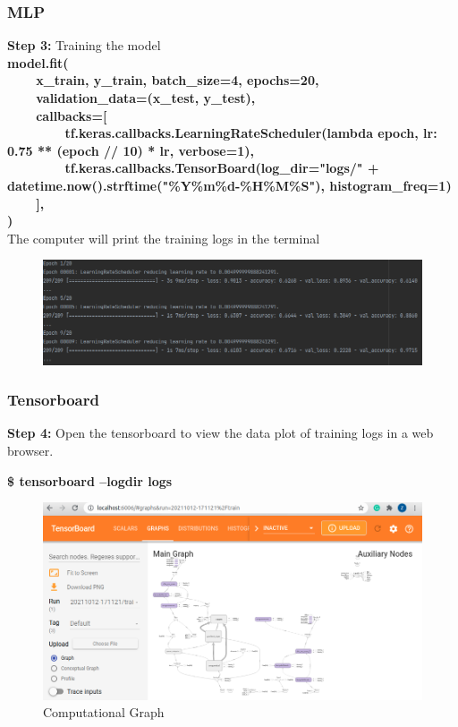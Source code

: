 \documentclass{beamer}
\begin{document}
\begin{frame}
	\frametitle{MLP}
	\begin{flushleft}
		\textbf{Step 3:} Training the model \\
		\textbf{\color{blue} \scriptsize
			model.fit( \\
			~~~~x\_train, y\_train, batch\_size=4, epochs=20, \\
			~~~~validation\_data=(x\_test,  y\_test), \\
			~~~~callbacks=[ \\
			~~~~~~~~tf.keras.callbacks.LearningRateScheduler(lambda epoch, lr: 0.75 ** (epoch // 10) * lr, verbose=1), \\
			~~~~~~~~tf.keras.callbacks.TensorBoard(log\_dir="logs/" + datetime.now().strftime("\%Y\%m\%d-\%H\%M\%S"), histogram\_freq=1) \\
			~~~~], \\
			) \\
		}
		The computer will print the training logs in the terminal
	\end{flushleft}
	\begin{center}
		\begin{figure}
	    \includegraphics[width=0.8\linewidth]{./src/figures/9.png}
	  \end{figure}
	\end{center}
\end{frame}

\begin{frame}
	\frametitle{Tensorboard}
	\begin{flushleft}
		\textbf{Step 4:} Open the tensorboard to view the data plot of training logs in a web browser. \\
	\end{flushleft}
	\begin{center}
		\textbf{\$ \color{blue} tensorboard --logdir logs}
	\end{center}
	\begin{center}
		\begin{figure}
        \includegraphics[width=0.85\linewidth]{./src/figures/10_2.png}
        \caption{Computational Graph}
		\end{figure}
	\end{center}
\end{frame}
\end{document}
